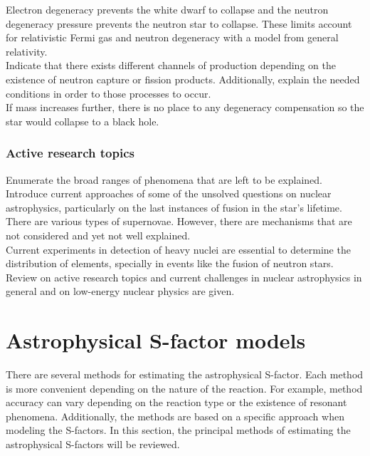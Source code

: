 \documentclass[openany]{book}
\begin{document}
Electron degeneracy prevents the white dwarf to collapse and the neutron degeneracy pressure prevents the neutron star to collapse. These limits account for relativistic Fermi gas and neutron degeneracy with a model from general relativity. \\

Indicate that there exists different channels of production depending on the existence of neutron capture or fission products. Additionally, explain the needed conditions in order to those processes to occur. \\ 

If mass increases further, there is no place to any degeneracy compensation so the star would collapse to a black hole.

\subsection{Active research topics}

Enumerate the broad ranges of phenomena that are left to be explained.  \\

Introduce current approaches of some of the unsolved questions on nuclear astrophysics, particularly on the last instances of fusion in the star's lifetime. \\

There are various types of  supernovae. However, there are mechanisms that are not considered and yet not well explained. \\

Current experiments in detection of heavy nuclei are essential to determine the distribution of elements, specially in events like the fusion of neutron stars.\\ 

Review on active research topics and current challenges in nuclear astrophysics in general \cite{arcones_bardayan_beers_bernstein_blackmon_messer_brown_brown_brune_champagne_et_2017} and on low-energy nuclear physics \cite{carlson_carpenter_casten_elster_fallon_gade_gross_hagen_hayes_higinbotham_et_2017} are given.



\chapter{Astrophysical S-factor models} \label{ch:sfactorModels}

There are several methods for estimating the astrophysical S-factor. Each method is more convenient depending on the nature of the reaction. For example, method accuracy can vary depending on  the reaction type or the existence of resonant phenomena. Additionally, the methods are based on a specific approach when modeling the S-factors. In this section, the principal methods of estimating the astrophysical S-factors will be reviewed.
\end{document}
